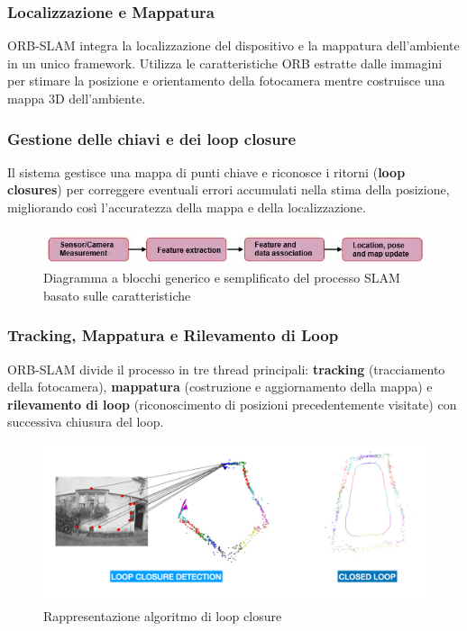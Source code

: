 \documentclass[12pt,a4paper]{report}
\begin{document}
\subsubsection{Localizzazione e Mappatura}
        ORB-SLAM integra la localizzazione del dispositivo e la mappatura dell'ambiente in un unico framework. Utilizza le caratteristiche ORB estratte dalle immagini per stimare la posizione e orientamento della fotocamera mentre costruisce una mappa 3D dell'ambiente.



\subsubsection{Gestione delle chiavi e dei loop closure}
        Il sistema gestisce una mappa di punti chiave e riconosce i ritorni (\textbf{loop closures}) per correggere eventuali errori accumulati nella stima della posizione, migliorando così l'accuratezza della mappa e della localizzazione.

\begin{figure}[h]
    \centering
    \includegraphics[width=1\linewidth]{img/SLAM_schema.jpg}
    \caption{Diagramma a blocchi generico e semplificato del processo SLAM basato sulle caratteristiche \cite{SLAM_algoritm2}}
    
\end{figure}

\subsubsection{Tracking, Mappatura e Rilevamento di Loop}
        ORB-SLAM divide il processo in tre thread principali: \textbf{tracking} (tracciamento della fotocamera), \textbf{mappatura} (costruzione e aggiornamento della mappa) e \textbf{rilevamento di loop} (riconoscimento di posizioni precedentemente visitate) con successiva chiusura del loop.

\begin{figure}[h]
    \centering
    \includegraphics[width=1\linewidth]{img/loop_closure.png}
    \caption{Rappresentazione algoritmo di loop closure \cite{loop_closure}}
    
\end{figure}
\end{document}
